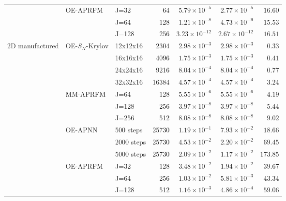 \begin{table}[t]
\begin{tabular}{lllrrrr}
 & OE-APRFM & J=32 & 64 & $5.79\times10^{-5}$ & $2.77\times10^{-5}$ & $16.60$\\
 &  & J=64 & 128 & $1.21\times10^{-8}$ & $4.73\times10^{-9}$ & $15.53$\\
 &  & J=128 & 256 & $3.23\times10^{-12}$ & $2.67\times10^{-12}$ & $16.51$\\
\midrule
2D manufactured & OE-$S_N$-Krylov & 12x12x16 & 2304 & $2.98\times10^{-3}$ & $2.98\times10^{-3}$ & $0.33$\\
 &  & 16x16x16 & 4096 & $1.75\times10^{-3}$ & $1.75\times10^{-3}$ & $0.41$\\
 &  & 24x24x16 & 9216 & $8.04\times10^{-4}$ & $8.04\times10^{-4}$ & $0.77$\\
 &  & 32x32x16 & 16384 & $4.57\times10^{-4}$ & $4.57\times10^{-4}$ & $3.24$\\
 & MM-APRFM & J=64 & 128 & $5.55\times10^{-6}$ & $5.55\times10^{-6}$ & $4.19$\\
 &  & J=128 & 256 & $3.97\times10^{-8}$ & $3.97\times10^{-8}$ & $5.44$\\
 &  & J=256 & 512 & $8.08\times10^{-8}$ & $8.08\times10^{-8}$ & $9.02$\\
 & OE-APNN & 500 steps & 25730 & $1.19\times10^{-1}$ & $7.93\times10^{-2}$ & $18.66$\\
 &  & 2000 steps & 25730 & $4.53\times10^{-2}$ & $2.20\times10^{-2}$ & $69.45$\\
 &  & 5000 steps & 25730 & $2.09\times10^{-2}$ & $1.17\times10^{-2}$ & $173.85$\\
 & OE-APRFM & J=32 & 128 & $3.48\times10^{-2}$ & $1.94\times10^{-2}$ & $39.67$\\
 &  & J=64 & 256 & $1.03\times10^{-2}$ & $5.81\times10^{-3}$ & $43.34$\\
 &  & J=128 & 512 & $1.16\times10^{-3}$ & $4.86\times10^{-4}$ & $59.06$\\
\bottomrule
\end{tabular}
\end{table}

